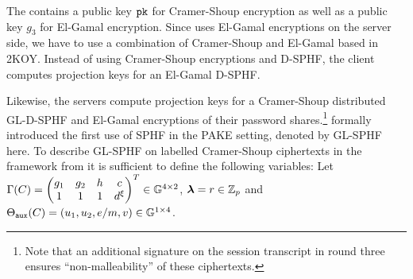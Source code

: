 The \crs contains a public key $\mathtt{pk}$ for Cramer-Shoup encryption as well as a public key $g_3$ for El-Gamal encryption.
Since \cite{Katz2012a} uses El-Gamal encryptions on the server side, we have to use a combination of Cramer-Shoup and El-Gamal based \SPHFF in 2KOY.
Instead of using Cramer-Shoup encryptions and \ac{D-SPHF}, the client computes projection keys for an El-Gamal \ac{D-SPHF}.

Likewise, the servers compute projection keys for a Cramer-Shoup distributed GL-D-SPHF and El-Gamal encryptions of their password shares.\footnote{Note that an additional signature on the session transcript in round three ensures ``non-malleability'' of these ciphertexts.}
\citet{Gennaro2003} formally introduced the first use of \ac{SPHF} in the \ac{PAKE} setting, denoted by GL-\ac{SPHF} here.
To describe GL-\ac{SPHF} on labelled Cramer-Shoup ciphertexts in the framework from \cite{cryptoeprint:2013:034} it is sufficient to define the following variables:
Let $\Gamma(C)=
\begin{pmatrix}
g_1 & g_2 & h & c \\
1 & 1 & 1 &  d^\xi
\end{pmatrix}^T \in \mathbb{G}^{4\times 2}$,
${\bm \lambda}=r\in\mathbb{Z}_p$ and $\Theta_\mathtt{aux}(C)=(u_1,u_2,e/m,v)\in\mathbb{G}^{1\times 4}$.
% 	
% 	
% 	

